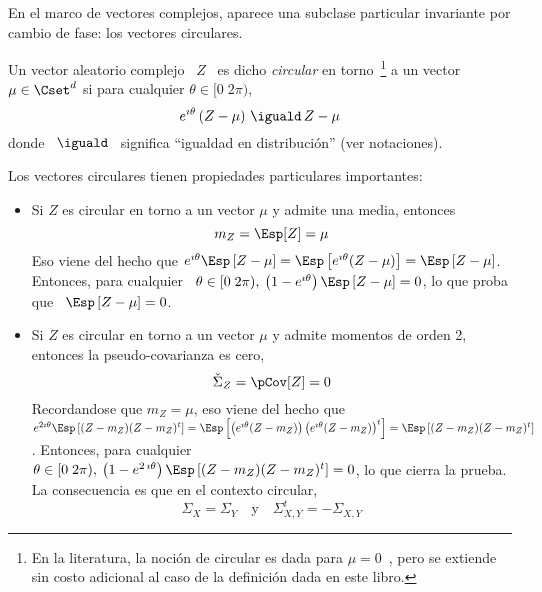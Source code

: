 En el  marco de vectores  complejos, aparece una subclase  particular invariante
por cambio de fase: los vectores circulares.
%
\begin{definicion}\label{Def:MP:VectorAleatorioComplejoCircular}
%
  Un  vector   aleatorio  complejo   \  $Z$  \   es  dicho  {\em   circular}  en
  torno~\footnote{En la literatura, la noci\'on  de circular es dada para $\mu =
    0$~\cite[Def.~24.3.2]{Lap17}, pero  se extiende sin costo  adicional al caso
    de la  definici\'on dada en este libro.}   a un vector $\mu  \in \Cset^d$ si
  para cualquier $\theta \in [0 \; 2 \pi)$,
  \[
  e^{\imath \theta} \left( Z - \mu \right) \, \iguald \, Z - \mu
  \]
  donde \ $\iguald$ \ significa ``igualdad en distribuci\'on'' (ver notaciones).
\end{definicion}

Los vectores circulares tienen propiedades particulares importantes:
%
\begin{itemize}
\item  Si $Z$  es circular  en torno a  un vector  $\mu$ y  admite una  media,
  entonces
  \[
  m_Z = \Esp[Z] = \mu
  \]
  Eso  viene del  hecho que  $e^{\imath  \theta} \Esp\left[  Z -  \mu \right]  =
  \Esp\left[  e^{\imath  \theta}  (Z  -  \mu)  \right]  =  \Esp\left[  Z  -  \mu
  \right]$. Entonces,  para cualquier \ $\theta \in  [0 \; 2 \pi),  \: \left(1 -
    e^{\imath \theta} \right) \Esp\left[ Z -  \mu \right] = 0$, lo que proba que
  \ $\Esp\left[ Z - \mu \right] = 0$.
%
\item Si $Z$ es circular en torno a un vector $\mu$ y admite momentos de orden
  2, entonces la pseudo-covarianza es  cero,
  \[
  \check{\Sigma}_Z = \pCov[Z] = 0
  \]
  Recordandose que $m_Z = \mu$, eso  viene del hecho que $e^{2 \imath \theta}
  \Esp\left[ (Z - m_Z) (Z - m_Z)^t \right] = \Esp\left[ \left( e^{\imath \theta}
      (Z - m_Z)  \right) \left( e^{\imath \theta} (Z -  m_Z) \right)^t \right] =
  \Esp\left[ (Z - m_Z) (Z - m_Z)^t \right]$.  Entonces, para cualquier \ $\theta
  \in [0 \; 2 \pi), \: \left(1  - e^{2 \, \imath \theta} \right) \Esp\left[ (Z -
    m_Z) (Z - m_Z)^t  \right] = 0$, lo que cierra la  prueba. La consecuencia es
  que en el contexto circular,
  \[
  \Sigma_X = \Sigma_Y \quad \mbox{y} \quad \Sigma_{X,Y}^t = - \Sigma_{X,Y}
  \]
\end{itemize}


